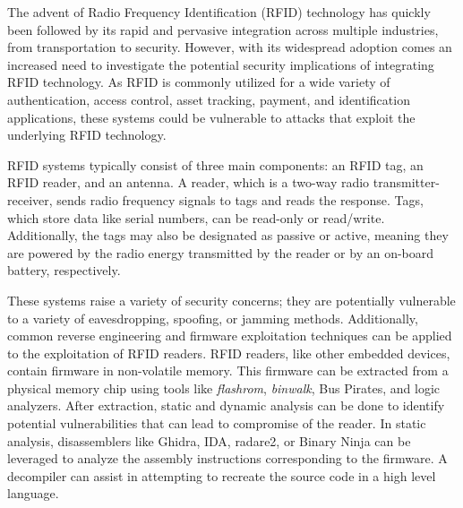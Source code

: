 
The advent of Radio Frequency Identification (RFID) technology has quickly been followed by its rapid and pervasive integration across multiple industries, from transportation to security. However, with its widespread adoption comes an increased need to investigate the potential security implications of integrating RFID technology. As RFID is commonly utilized for a wide variety of authentication, access control, asset tracking, payment, and identification applications, these systems could be vulnerable to attacks that exploit the underlying RFID technology. 

RFID systems typically consist of three main components: an RFID tag, an RFID reader, and an antenna. A reader, which is a two-way radio transmitter-receiver, sends radio frequency signals to tags and reads the response. Tags, which store data like serial numbers, can be read-only or read/write. Additionally, the tags may also be designated as passive or active, meaning they are powered by the radio energy transmitted by the reader or by an on-board battery, respectively.

These systems raise a variety of security concerns; they are potentially vulnerable to a variety of eavesdropping, spoofing, or jamming methods. Additionally, common reverse engineering and firmware exploitation techniques can be applied to the exploitation of RFID readers. RFID readers, like other embedded devices, contain firmware in non-volatile memory. This firmware can be extracted from a physical memory chip using tools like \textit{flashrom}, \textit{binwalk}, Bus Pirates, and logic analyzers. After extraction, static and dynamic analysis can be done to identify potential vulnerabilities that can lead to compromise of the reader. In static analysis, disassemblers like Ghidra, IDA, radare2, or Binary Ninja can be leveraged to analyze the assembly instructions corresponding to the firmware. A decompiler can assist in attempting to recreate the source code in a high level language.  